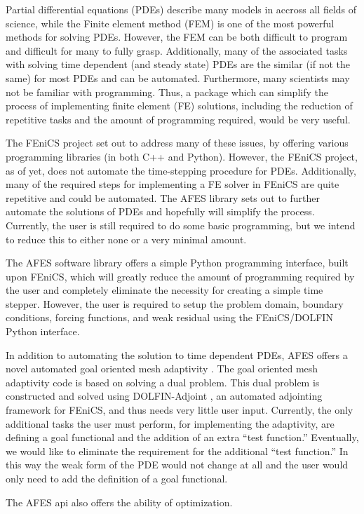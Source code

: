 Partial differential equations (PDEs) describe many models in accross all fields
of science, while the Finite element method (FEM) is one of the most powerful
methods for solving PDEs. However, the FEM can be both difficult to program and
difficult for many to fully grasp. Additionally, many of the associated tasks
with solving time dependent (and steady state) PDEs are the similar (if not the
same) for most PDEs and can be automated. Furthermore, many scientists may
not be familiar with programming. Thus, a package which can simplify the
process of implementing finite element (FE) solutions, including the reduction
of repetitive tasks and the amount of programming required, would be very useful.

The FEniCS project\cite{Alnae2011} set out to address many of these issues, by
offering various programming libraries (in both C++ and Python). However, the
FEniCS project, as of yet, does not automate the time-stepping procedure for
PDEs. Additionally, many of the required steps for implementing a FE solver in
FEniCS are quite repetitive and could be automated. The AFES library sets out to
further automate the solutions of PDEs and hopefully will simplify the process.
Currently, the user is still required to do some basic programming, but we
intend to reduce this to either none or a very minimal amount.

The AFES software library offers a simple Python programming interface, built
upon FEniCS, which will greatly reduce the amount of programming required by the
user and completely eliminate the necessity for creating a simple time stepper.
However, the user is required to setup the problem domain, boundary conditions,
forcing functions, and weak residual using the FEniCS/DOLFIN Python interface.

In addition to automating the solution to time dependent PDEs, AFES offers a
novel automated goal oriented mesh adaptivity \cite{Foster2014e, Jansson2014a,
Jansson2014b}.  The goal oriented mesh adaptivity code is based on solving a
dual problem.  This dual problem is constructed and solved using DOLFIN-Adjoint
\cite{Ham2012, Ferrell2014}, an automated adjointing framework for FEniCS, and
thus needs very little user input.  Currently, the only additional tasks the
user must perform, for implementing the adaptivity, are defining a goal
functional and the addition of an extra ``test function.'' Eventually, we would
like to eliminate the requirement for the additional ``test function.'' In this
way the weak form of the PDE would not change at all and the user would only
need to add the definition of a goal functional.

The AFES api also offers the ability of optimization.
